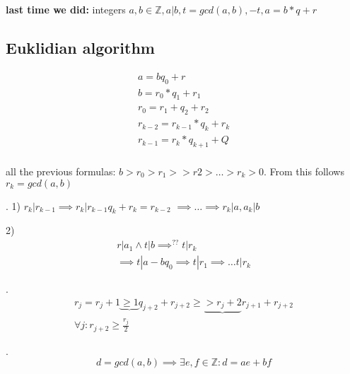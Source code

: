 



\textbf{last time we did:}
integers $a,b \in \mathbb{Z}, a|b, t = gcd(a,b), -t, a = b*q + r$

\subsection{Euklidian algorithm}
\begin{align*}
  a = b q_0 +r \\
  b = r_0*q_1 + r_1 \\
  r_0 = r_1 + q_2 + r_2\\
  r_{k-2} = r_{k-1} * q_k + r_k \\
  r_{k-1} = r_{k} * q_{k+1} + Q \\
\end{align*}

all the previous formulas: $ b > r_0 > r_1 >> r2 > \ldots > r_k > 0$. From this follows $r_k = gcd(a,b)$

\Proof.
1) $r_k | r_{k-1} \implies r_k | r_{k-1} q_k + r_k = r_{k-2}$
  $\implies \ldots \implies r_k | a, a_k | b$

2) 
\begin{align*}
  r | a_1 \wedge t | b \implies^{??} t| r_k \\
  \implies t | a-bq_0 \implies t | r_1 \implies \ldots t|r_k
\end{align*}


\Remark.
\begin{align*}
  r_j = r_j + 1 \underbrace{\geq 1}{q_{j+2}} + r_{j+2} \geq \underbrace{ > r_j+2}{r_{j+1}} + r_{j+2} \\
  \forall j: r_{j+2} \geq \frac{r_j}{2}
\end{align*}

\Theorem.
\[
  d = gcd(a,b) \implies \exists e,f \in \mathbb{Z}: d = ae + bf
\]

